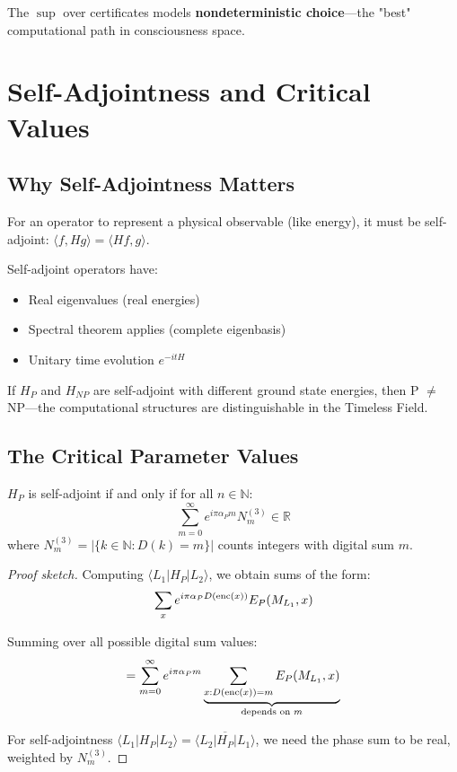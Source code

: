 The $\sup$ over certificates models \textbf{nondeterministic choice}—the "best" computational path in consciousness space.

\section{Self-Adjointness and Critical Values}

\subsection{Why Self-Adjointness Matters}

\begin{keyidea}
For an operator to represent a physical observable (like energy), it must be self-adjoint: $\langle f, Hg \rangle = \langle Hf, g \rangle$.

Self-adjoint operators have:
\begin{itemize}
\item Real eigenvalues (real energies)
\item Spectral theorem applies (complete eigenbasis)
\item Unitary time evolution $e^{-itH}$
\end{itemize}

If $H_P$ and $H_{NP}$ are self-adjoint with different ground state energies, then P $\neq$ NP—the computational structures are distinguishable in the Timeless Field.
\end{keyidea}

\subsection{The Critical Parameter Values}

\begin{theorem}\label{thm:self-adjoint-criterion}
$H_P$ is self-adjoint if and only if for all $n \in \mathbb{N}$:
\begin{equation}
\sum_{m=0}^{\infty} e^{i\pi\alpha_P m} N_m^{(3)} \in \mathbb{R}
\end{equation}
where $N_m^{(3)} = |\{k \in \mathbb{N} : D(k) = m\}|$ counts integers with digital sum $m$.
\end{theorem}

\begin{proof}[Proof sketch]
Computing $\langle L_1 | H_P | L_2 \rangle$, we obtain sums of the form:
\begin{equation}
\sum_{x} e^{i\pi\alpha_P D(\operatorname{enc}(x))} E_P(M_{L_1}, x)
\end{equation}

Summing over all possible digital sum values:
\begin{equation}
= \sum_{m=0}^{\infty} e^{i\pi\alpha_P m} \underbrace{\sum_{x: D(\operatorname{enc}(x)) = m} E_P(M_{L_1}, x)}_{\text{depends on } m}
\end{equation}

For self-adjointness $\langle L_1 | H_P | L_2 \rangle = \overline{\langle L_2 | H_P | L_1 \rangle}$, we need the phase sum to be real, weighted by $N_m^{(3)}$.
\end{proof}

